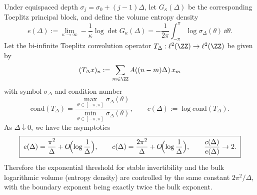%

\begin{corollary}\label{cor:xi-hellinger-toeplitz-dense-2x-law}
Under equispaced depth \(\sigma_j=\sigma_0+(j-1)\Delta\), let \(G_\kappa(\Delta)\) be the corresponding Toeplitz principal block, and define the volume entropy density
\[
e(\Delta):=\lim_{\kappa\to\infty}-\frac1\kappa\log\det G_\kappa(\Delta)
=-\frac{1}{2\pi}\int_{-\pi}^{\pi}\log\sigma_\Delta(\theta)\,\dd\theta.
\]
Let the bi-infinite Toeplitz convolution operator \(T_\Delta:\ell^2(\ZZ)\to\ell^2(\ZZ)\) be given by
\[
(T_\Delta x)_n:=\sum_{m\in\ZZ}A((n-m)\Delta)\,x_m
\]
with symbol \(\sigma_\Delta\) and condition number
\[
\mathrm{cond}(T_\Delta)=\frac{\max_{\theta\in[-\pi,\pi]}\sigma_\Delta(\theta)}{\min_{\theta\in[-\pi,\pi]}\sigma_\Delta(\theta)},
\qquad
c(\Delta):=\log\mathrm{cond}(T_\Delta).
\]
As \(\Delta\downarrow0\), we have the asymptotics
\[
\boxed{\;
e(\Delta)=\frac{\pi^2}{\Delta}+O\!\Bigl(\log\frac1\Delta\Bigr),\qquad
c(\Delta)=\frac{2\pi^2}{\Delta}+O\!\Bigl(\log\frac1\Delta\Bigr),\qquad
\frac{c(\Delta)}{e(\Delta)}\to 2.\;}
\]
Therefore the exponential threshold for stable invertibility and the bulk logarithmic volume (entropy density) are controlled by the same constant \(2\pi^2/\Delta\), with the boundary exponent being exactly twice the bulk exponent.
\end{corollary}
